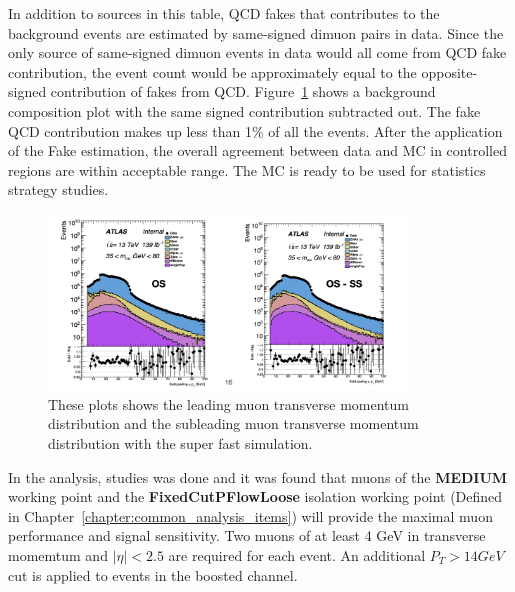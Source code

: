 In addition to sources in this table, QCD fakes that contributes to the background events are estimated by same-signed dimuon pairs in data. Since the only source of same-signed dimuon events in data would all come from QCD fake contribution, the event count would be approximately equal to the opposite-signed contribution of fakes from QCD. Figure~\ref{fig:samesigned} shows a background composition plot with the same signed contribution subtracted out. The fake QCD contribution makes up less
than 1\% of all the events. After the application of the Fake estimation, the overall agreement between data and MC in controlled regions are within acceptable range. The MC is ready to be used for statistics strategy studies.

\begin{figure}[!htb]
    \begin{center}
        \includegraphics[width=0.85\textwidth]{figures/chapter_dimuon/samesigned}
        \caption{
        These plots shows the leading muon transverse momentum distribution and the subleading muon transverse momentum distribution with the super fast simulation.  
        }
        \label{fig:samesigned}
    \end{center}
\end{figure}
\FloatBarrier

In the analysis, studies was done and it was found that muons of the \textbf{MEDIUM} working point and the \textbf{FixedCutPFlowLoose} isolation working point (Defined in Chapter~\ref{chapter:common_analysis_items}) will provide the maximal muon performance and signal sensitivity. Two muons of at least 4 GeV in transverse momemtum and $|\eta|<2.5$ are required for each event. An additional $P_{T}> 14GeV$ cut is applied to events in the boosted channel.

